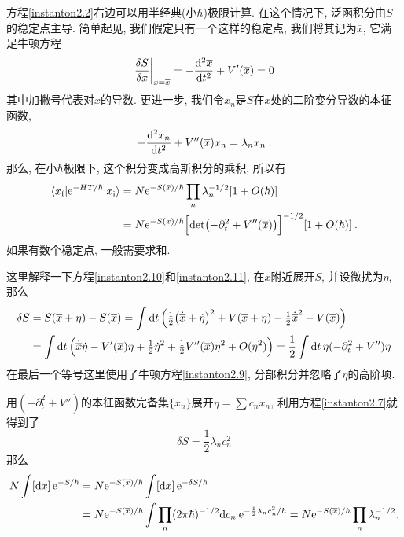 方程\eqref{instanton2.2}右边可以用半经典(小$\hbar$)极限计算. 在这个情况下, 泛函积分由$S$的稳定点主导. 简单起见, 我们假定只有一个这样的稳定点, 我们将其记为$\overline{x}$, 它满足牛顿方程
\begin{equation}
    \frac{\delta S}{\delta x}\biggr\vert_{x=\overline{x}} = 
    -\frac{\mathrm{d}^{2}\overline{x}}{\mathrm{d} t^{2}} + V'(\overline{x}) = 0 \label{instanton2.9}
\end{equation} 
其中加撇号代表对$x$的导数. 更进一步, 我们令$x_{n}$是$S$在$\overline{x}$处的二阶变分导数的本征函数,
\begin{equation}
    -\frac{\mathrm{d}^{2} x_{n}}{\mathrm{d} t^{2}} + V''(\overline{x})x_{n} = \lambda_{n}x_{n} \:. \label{instanton2.10} 
\end{equation}
那么, 在小$\hbar$极限下, 这个积分变成高斯积分的乘积, 所以有
\begin{align}
    \langle x_{\text{f}} \vert \mathrm{e}^{-HT/\hbar} \vert x_{\text{i}}\rangle 
   & = N \mathrm{e}^{-S(\bar{x})/\hbar}\prod_{n}\lambda_{n}^{-1/2}[1+O(\hbar)] \nonumber \\
   &= N \mathrm{e}^{-S(\bar{x})/\hbar}\Bigl[\det\bigl(-\partial_{t}^{2}+V''(\overline{x})\bigr)\Bigr]^{-1/2}[1+O(\hbar)] \:. \label{instanton2.11}
\end{align}
如果有数个稳定点, 一般需要求和.
\begin{tcolorbox}
    这里解释一下方程\eqref{instanton2.10}和\eqref{instanton2.11}, 在$\overline{x}$附近展开$S$, 并设微扰为$\eta$, 那么
    \begin{align*}
        \delta S&= S(\overline{x}+\eta)-S(\overline{x}) 
        = \int \mathrm{d} t\, \Bigl(\tfrac{1}{2}\bigl(\dot{\overline{x}}+\dot{\eta}\bigr)^{2}+V(\overline{x}+\eta)-\tfrac{1}{2}\dot{\overline{x}}^{2}-V(\overline{x})\Bigr) \\
        &=\int \mathrm{d} t\,\Bigl(\dot{\overline{x}}\dot{\eta}- V'(\overline{x})\eta+\tfrac{1}{2}\dot{\eta}^{2}+\tfrac{1}{2}V''(\overline{x})\eta^{2}+O(\eta^{2})\Bigr)
        =\frac{1}{2}\int \mathrm{d} t\, \eta(-\partial_{t}^{2}+V'')\eta
    \end{align*}
在最后一个等号这里使用了牛顿方程\eqref{instanton2.9}, 分部积分并忽略了$\eta$的高阶项. 

用$(-\partial_{t}^{2}+V'')$的本征函数完备集$\{x_{n}\}$展开$\eta=\sum c_{n}x_{n}$, 利用方程\eqref{instanton2.7}就得到了
\begin{equation*}
    \delta S= \frac{1}{2} \lambda_{n}c_{n}^{2}
\end{equation*}
那么
\begin{align*}
    N \int [\mathrm{d} x]\, \mathrm{e}^{-S/\hbar}&=N \mathrm{e}^{-S(\overline{x})/\hbar} \int [\mathrm{d} x]\, \mathrm{e}^{-\delta S/\hbar} \\
    &=N \mathrm{e}^{-S(\overline{x})/\hbar} \int \prod_{n} (2\pi\hbar)^{-1/2} \mathrm{d} c_{n}\:\mathrm{e}^{-\frac{1}{2} \lambda_{n}c_{n}^{2}/\hbar}
    =N \mathrm{e}^{-S(\overline{x})/\hbar}\prod_{n} \lambda_{n}^{-1/2} .
\end{align*}
\end{tcolorbox}


